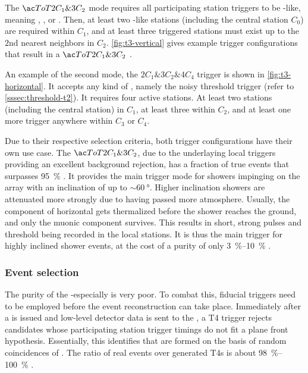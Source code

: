 The $\ToT2C_1\&3C_2$ mode requires all participating station triggers to be 
\ToT-like, meaning \ToT, \ToTd, or \MoPS. Then, at least two \ToT-like stations
(including the central station $C_0$) are required within $C_1$, and at least 
three triggered stations must exist up to the $2\mathrm{nd}$ nearest neighbors 
in $C_2$. \cref{fig:t3-vertical} gives example trigger configurations that 
result in a $\ToT2C_1\&3C_2$ \TTHREE.

An example of the second mode, the $2C_1\&3C_2\&4C_4$ \TTHREE trigger is shown
in \cref{fig:t3-horizontal}. It accepts any kind of \TTWO, namely the noisy 
threshold trigger (refer to \cref{sssec:threshold-t2}). It requires four 
active stations. At least two stations (including the central station) in 
$C_1$, at least three within $C_2$, and at least one more trigger anywhere 
within $C_3$ or $C_4$.

Due to their respective selection criteria, both trigger configurations have 
their own use case. The $\ToT2C_1\&3C_2$, due to the underlaying local triggers
providing an excellent background rejection, has a fraction of true \EAS events
that surpasses \SI{95}{\percent} . It provides the
main trigger mode for showers impinging on the array with an inclination of up 
to $\sim\SI{60}{\degree}$. Higher inclination showers are attenuated more 
strongly due to having passed more atmosphere. Usually, the \EM component of 
horizontal \EASs gets thermalized before the shower reaches the ground, and 
only the muonic component survives. This results in short, strong pulses and 
threshold \TTWOs being recorded in the local stations.  It is thus the main 
trigger for highly inclined shower events, at the cost of a purity of only 
\SIrange{3}{10}{\percent}  \cite{todo, abrahamTriggerApertureSurface2010}.

\subsubsection{Event selection}

The purity of the \SD-\TTHREEs especially is very poor. To combat this, 
fiducial triggers need to be employed before the event reconstruction can take
place. Immediately after a \TTHREE is issued and low-level detector data is 
sent to the \CDAS, a T4 trigger rejects \TTHREE candidates whose participating
station trigger timings do not fit a plane front hypothesis. Essentially, this 
identifies \TTHREEs that are formed on the basis of random coincidences of 
\TTWOs. The ratio of real \EAS events over generated T4s is about 
\SIrange{98}{100}{\percent} \cite{abrahamTriggerApertureSurface2010}.

